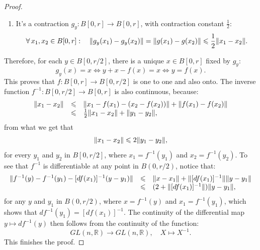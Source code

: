 \begin{proof}
\begin{enumerate}
\[			      \forall\,{x}\in{B[0,r]}:\quad
			      \norm{g_{y}(x)}
			      \leqslant
			      \norm{y}+\norm{g(x)}
			      \leqslant
			      \frac{r}{2}+\frac{\norm{x}}{2}
			      \leqslant
			      r,
		      \]
		\item
		      It's a contraction \(g_{y}:{B[0,r]}\to{B[0,r]}\), with contraction
		      constant \(\frac{1}{2}\):
		      \[
			      \forall\,{x_{1},x_{2}}\in{B[0,r]}:\quad
			      \lVert g_{y}(x_{1})-g_{y}(x_{2})\rVert
			      =
			      \lVert g(x_{1})-g(x_{2})\rVert
			      \leqslant
			      \frac{1}{2}\lVert x_{1}-x_{2}\rVert.
		      \]
	\end{enumerate}
	Therefore, for each \({y}\in{B[0,r/2]}\), there is a unique
	\({x}\in{B[0,r]}\) fixed by \(g_{y}\):
	\[
		g_{y}(x)=x
		\iff
		y + x - f(x) = x
		\iff
		y = f(x).
	\]
	This proves that \(f:{B[0,r]}\to{B[0,r/2]}\) is one to one and also onto. The
	inverse function \(f^{-1}:{B[0,r/2]}\to{B[0,r]}\) is also continuous, because:
	\[
		\begin{array}{rcl}
			\lVert x_{1}-x_{2}\rVert
			 & \leqslant &
			\lVert x_{1}-f(x_{1}) - (x_{2}-f(x_{2}))\rVert
			+
			\lVert f(x_{1})-f(x_{2})\rVert
			\\
			 & \leqslant &
			\frac{1}{2}\lVert x_{1}-x_{2}\rVert
			+
			\lVert y_{1}-y_{2}\rVert,
		\end{array}
	\]
	from what we get that
	\[
		\lVert x_{1}-x_{2}\rVert\leqslant{2\lVert y_{1}-y_{2}\rVert},
	\]
	for every \(y_{1}\) and \(y_{2}\) in \(B[0,r/2]\), where
	\(x_{1}=f^{-1}(y_{1})\) and \(x_{2}=f^{-1}(y_{2})\). To see that \(f^{-1}\) is
	differentiable at any point in \(B(0,r/2)\), notice that:
	\[
		\begin{array}{rcl}
			\lVert f^{-1}(y)-f^{-1}(y_{1})-[df(x_{1})]^{-1}(y-y_{1})\rVert
			 & \leqslant &
			\lVert x-x_{1}\rVert
			+
			\lVert[df(x_{1})]^{-1}\rVert\lVert y-y_{1}\rVert
			\\
			 & \leqslant &
			(2+\lVert[df(x_{1})]^{-1}\rVert)\lVert y-y_{1}\rVert,
		\end{array}
	\]
	for any \(y\) and \(y_{1}\) in \(B(0,r/2)\), where \(x=f^{-1}(y)\) and
	\(x_{1}=f^{-1}(y_{1})\), which shows that \(df^{-1}(y_{1})=[df(x_{1})]^{-1}\).
	The continuity of the differential map \({y}\mapsto{df^{-1}(y)}\) then follows
	from the continuity of the function:
	\[
		{GL(n,\mathbb{R})}\to{GL(n,\mathbb{R})},\quad{{X}\mapsto{X^{-1}}}.
	\]
	This finishes the proof.
\end{proof}
